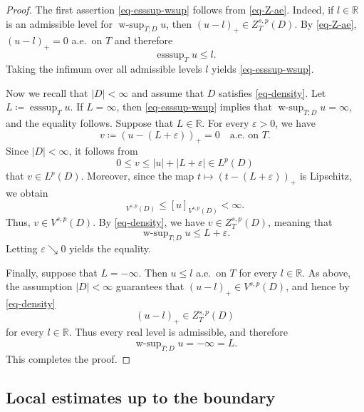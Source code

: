 \documentclass[11pt]{amsart}
\theoremstyle{plain}
\theoremstyle{definition}
\numberwithin{equation}{section}
\DeclareMathOperator*{\esssup}{esssup}
\DeclareMathOperator*{\wsup}{w-sup}
\begin{document}
\begin{proof}
The first assertion \eqref{eq-esssup-wsup} follows from \eqref{eq-Z-ae}. Indeed, if $l \in \mathbb{R}$ is an admissible level for $\wsup_{T; D}{u}$, then $(u-l)_+ \in Z^{s, p}_T(D)$. By \eqref{eq-Z-ae}, $(u-l)_+ =0$ a.e.\ on $T$ and therefore
\begin{equation*}
\esssup_T u \leq l.
\end{equation*}
Taking the infimum over all admissible levels $l$ yields \eqref{eq-esssup-wsup}.

Now we recall that $|D|<\infty$  and assume that $D$ satisfies \eqref{eq-density}. Let $L\coloneqq \esssup_T{u}$. If $L=\infty$, then \eqref{eq-esssup-wsup} implies that $\wsup_{T; D}{u}=\infty$, and the equality follows. Suppose that $L \in \mathbb{R}$. For every $\varepsilon>0$, we have
\begin{equation*}
v \coloneqq (u-(L+\varepsilon))_+=0 \quad\text{a.e.\ on }T.
\end{equation*}
Since $|D|<\infty$, it follows from
\begin{equation*}
0 \leq v \leq |u| + |L+\varepsilon| \in L^p(D)
\end{equation*}
that $v \in L^p(D)$. Moreover, since the map $t \mapsto (t-(L+\varepsilon))_+$ is Lipschitz, we obtain
\begin{equation*}
[v]_{V^{s, p}(D)} \leq [u]_{V^{s, p}(D)} < \infty.
\end{equation*}
Thus, $v \in V^{s, p}(D)$. By \eqref{eq-density}, we have $v \in Z^{s, p}_T(D)$, meaning that
\begin{equation*}
\wsup_{T;D}{u} \leq L+\varepsilon.
\end{equation*}
Letting $\varepsilon \searrow 0$ yields the equality.

Finally, suppose that $L=-\infty$. Then $u \leq l$ a.e.\ on $T$ for every $l \in \mathbb{R}$. As above, the assumption $|D|<\infty$ guarantees that $(u-l)_+ \in V^{s, p}(D)$, and hence by \eqref{eq-density}
\begin{equation*}
(u-l)_+ \in Z^{s, p}_T(D)
\end{equation*}
for every $l \in \mathbb{R}$. Thus every real level is admissible, and therefore
\begin{equation*}
\wsup_{T; D}u=-\infty=L.
\end{equation*}
This completes the proof.
\end{proof}



\subsection{Local estimates up to the boundary}
\end{document}
